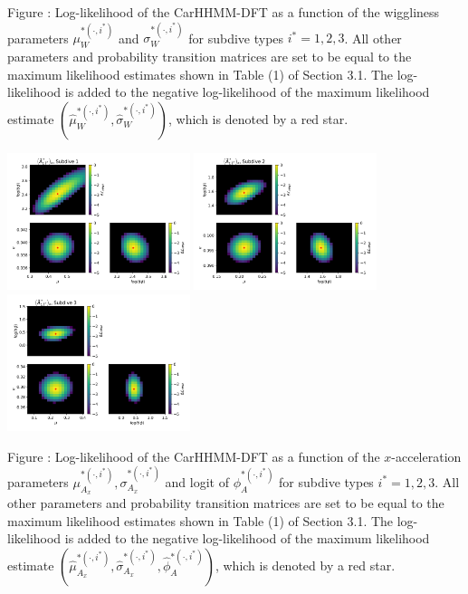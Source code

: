 \documentclass{article}
\begin{document}
        \noindent Figure : Log-likelihood of the CarHHMM-DFT as a function of the wiggliness parameters $\mu_W^{*(\cdot,i^*)}$ and $\sigma_W^{*(\cdot,i^*)}$ for subdive types $i^* = 1,2,3$. All other parameters and probability transition matrices are set to be equal to the maximum likelihood estimates shown in Table (1) of Section 3.1. The log-likelihood is added to the negative log-likelihood of the maximum likelihood estimate $(\hat \mu_W^{*(\cdot,i^*)}, \hat \sigma_W^{*(\cdot,i^*)})$, which is denoted by a red star.
        \addtocounter{fignum}{1}
        
        \newpage
        
        \begin{center}
        \includegraphics[width=2.1in]{../Plots/2019/20190902-182840-CATs_OB_1_0_267_CarHHMM2_fine-theta-likelihood-Ax-0.png}
        \includegraphics[width=2.1in]{../Plots/2019/20190902-182840-CATs_OB_1_0_267_CarHHMM2_fine-theta-likelihood-Ax-1.png}
        \includegraphics[width=2.1in]{../Plots/2019/20190902-182840-CATs_OB_1_0_267_CarHHMM2_fine-theta-likelihood-Ax-2.png}
        \end{center}
        
        \noindent Figure : Log-likelihood of the CarHHMM-DFT as a function of the $x$-acceleration parameters $\mu_{A_x}^{*(\cdot,i^*)}, \sigma_{A_x}^{*(\cdot,i^*)}$ and logit of $\phi_{A}^{*(\cdot,i^*)}$ for subdive types $i^* = 1,2,3$. All other parameters and probability transition matrices are set to be equal to the maximum likelihood estimates shown in Table (1) of Section 3.1. The log-likelihood is added to the negative log-likelihood of the maximum likelihood estimate $(\hat \mu_{A_x}^{*(\cdot,i^*)}, \hat \sigma_{A_x}^{*(\cdot,i^*)}, \hat \phi_{A}^{*(\cdot,i^*)})$, which is denoted by a red star.
        \addtocounter{fignum}{1}
        
\end{document}
